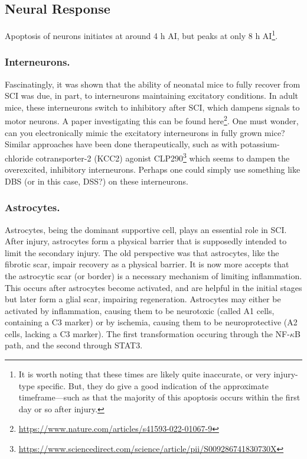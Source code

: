 \subsection{Neural Response}

Apoptosis of neurons initiates at around 4 h AI, but peaks at only 8 h AI\footnote{It is worth noting that these times are likely quite inaccurate, or very injury-type specific. But, they do give a good indication of the approximate timeframe---such as that the majority of this apoptosis occurs within the first day or so after injury.}. 

\subsubsection{Interneurons.}
Fascinatingly, it was shown that the ability of neonatal mice to fully recover from SCI was due, in part, to interneurons maintaining excitatory conditions. In adult mice, these interneurons switch to inhibitory after SCI, which dampens signals to motor neurons. A paper investigating this can be found here\footnote{\url{https://www.nature.com/articles/s41593-022-01067-9}}. One must wonder, can you electronically mimic the excitatory interneurons in fully grown mice? Similar approaches have been done therapeutically, such as with potassium-chloride cotransporter-2 (KCC2) agonist CLP290\footnote{\url{https://www.sciencedirect.com/science/article/pii/S009286741830730X}} which seems to dampen the overexcited, inhibitory interneurons. Perhaps one could simply use something like DBS (or in this case, DSS?) on these interneurons.  

\subsubsection{Astrocytes.}
Astrocytes, being the dominant supportive cell, plays an essential role in SCI. After injury, astrocytes form a physical barrier that is supposedly intended to limit the secondary injury. The old perspective was that astrocytes, like the fibrotic scar, impair recovery as a physical barrier. It is now more accepts that the astrocytic scar (or border) is a necessary mechanism of limiting inflammation. This occurs after astrocytes become activated, and are helpful in the initial stages but later form a glial scar, impairing regeneration. Astrocytes may either be activated by inflammation, causing them to be neurotoxic (called A1 cells, containing a C3 marker) or by ischemia, causing them to be neuroprotective (A2 cells, lacking a C3 marker). The first transformation occuring through the NF-$\kappa$B path, and the second through STAT3.\newline

